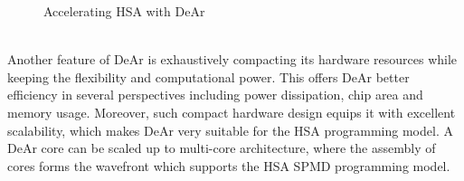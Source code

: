 \begin{figure}[!ht]
    \begin{center}
        \hfill
    \end{center}
    \caption{Accelerating HSA with DeAr}
    \label{fig:bb}
\end{figure}
\\\indent 
Another feature of DeAr is exhaustively compacting its hardware resources while keeping the flexibility and computational power.
This offers DeAr better efficiency in several perspectives including power dissipation, chip area and memory usage.
Moreover, such compact hardware design equips it with excellent scalability, 
which makes DeAr very suitable for the HSA programming model.
A DeAr core can be scaled up to multi-core architecture, 
where the assembly of cores forms the wavefront which supports the HSA SPMD programming model.
